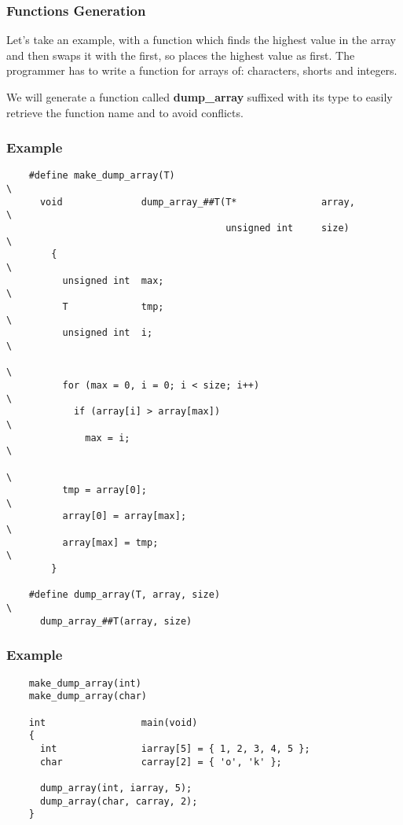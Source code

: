 
\begin{frame}
  \frametitle{Functions Generation}

  Let's take an example, with a function which finds the highest value in
  the array and then swaps it with the first, so places the highest value
  as first. The programmer has to write a function for arrays of:
  characters, shorts and integers.

  \nl

  We will generate a function called \textbf{dump\_array} suffixed with
  its type to easily retrieve the function name and to avoid conflicts.
\end{frame}


\begin{frame}[containsverbatim]
  \frametitle{Example}

  \begin{verbatim}
    #define make_dump_array(T)                                          \
      void              dump_array_##T(T*               array,          \
                                       unsigned int     size)           \
        {                                                               \
          unsigned int  max;                                            \
          T             tmp;                                            \
          unsigned int  i;                                              \
                                                                        \
          for (max = 0, i = 0; i < size; i++)                           \
            if (array[i] > array[max])                                  \
              max = i;                                                  \
                                                                        \
          tmp = array[0];                                               \
          array[0] = array[max];                                        \
          array[max] = tmp;                                             \
        }

    #define dump_array(T, array, size)                                  \
      dump_array_##T(array, size)
  \end{verbatim}
\end{frame}


\begin{frame}[containsverbatim]
  \frametitle{Example}

  \begin{verbatim}
    make_dump_array(int)
    make_dump_array(char)

    int                 main(void)
    {
      int               iarray[5] = { 1, 2, 3, 4, 5 };
      char              carray[2] = { 'o', 'k' };

      dump_array(int, iarray, 5);
      dump_array(char, carray, 2);
    }
  \end{verbatim}
\end{frame}

